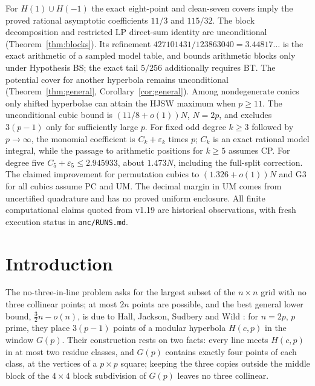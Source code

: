 \documentclass[11pt]{article}
\theoremstyle{remark}
\newcommand{\Hc}{H(c,p)}
\newcommand{\Gp}{G(p)}
\begin{document}
For $H(1)\cup H(-1)$ the exact eight-point and clean-seven covers imply the proved rational asymptotic coefficients $11/3$ and $115/32$.
The block decomposition and restricted LP direct-sum identity are unconditional (Theorem~\ref{thm:blocks}).
Its refinement $427101431/123863040=3.44817\ldots$ is the exact arithmetic of a sampled model table,
and bounds arithmetic blocks only under Hypothesis BS; the exact tail $5/256$ additionally requires BT.
The potential cover for another hyperbola remains unconditional (Theorem~\ref{thm:general}, Corollary~\ref{cor:general}).
Among nondegenerate conics only shifted hyperbolae can attain the HJSW maximum when $p\ge11$.
The unconditional cubic bound is $(11/8+o(1))N$, $N=2p$, and excludes $3(p-1)$ only for sufficiently large $p$.
For fixed odd degree $k\ge3$ followed by $p\to\infty$, the monomial coefficient is $C_k+\varepsilon_k$ times $p$;
$C_k$ is an exact rational model integral, while the passage to arithmetic positions for $k\ge5$ assumes CP.
For degree five $C_5+\varepsilon_5\le2.945933$, about $1.473N$, including the full-split correction.
The claimed improvement for permutation cubics to $(1.326+o(1))N$ and G3 for all cubics assume PC and UM.
The decimal margin in UM comes from uncertified quadrature and has no proved uniform enclosure.
All finite computational claims quoted from v1.19 are historical observations, with fresh execution status in \texttt{anc/RUNS.md}.

\section{Introduction}

The no-three-in-line problem asks for the largest subset of the $n\times n$ grid with no three collinear points; at most
$2n$ points are possible, and the best general lower bound, $\tfrac32 n-o(n)$, is due to Hall, Jackson, Sudbery and Wild
\cite{HJSW75}: for $n=2p$, $p$ prime, they place $3(p-1)$ points of a modular hyperbola $\Hc$ in the window $\Gp$.  Their
construction rests on two facts: every line meets $\Hc$ in at most two residue classes, and $\Gp$ contains exactly four
points of each class, at the vertices of a $p\times p$ square; keeping the three copies outside the middle block of the
$4\times4$ block subdivision of $\Gp$ leaves no three collinear.
\end{document}
